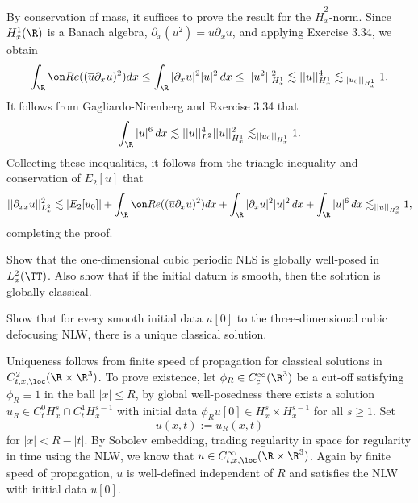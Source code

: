 \begin{solution}
	By conservation of mass, it suffices to prove the result for the $\dot H^2_x$-norm. Since $H^1_x (\R)$ is a Banach algebra, $\partial_x (u^2) = u \partial_x u$, and applying Exercise 3.34, we obtain
		\[ \int_\R \Re ((\overline u \partial_x u)^2) dx \leq \int_\R |\partial_x u|^2 |u|^2 \, dx \leq || u^2 ||_{H^1_x}^2 \lesssim ||u||_{H^1_x}^4 \lesssim_{||u_0||_{H^1_x}} 1.\]
	It follows from Gagliardo-Nirenberg and Exercise 3.34 that
		\[ \int_{\R} |u|^6 \, dx \lesssim ||u||_{L^2}^4 ||u||_{\dot H^1_x}^2 \lesssim_{||u_0||_{H^1_x}} 1. \]
	Collecting these inequalities, it follows from the triangle inequality and conservation of $E_2 [u]$ that	
		\[ ||\partial_{xx} u||_{L^2_x}^2 \lesssim |E_2[u_0]| + \int_\R \Re ((\overline u \partial_x u)^2) dx + \int_\R |\partial_x u|^2 |u|^2 \, dx  + \int_{\R} |u|^6 \, dx \lesssim_{||u||_{H^2_x}} 1,\]	
	completing the proof. 
\end{solution}

\begin{statement}
	Show that the one-dimensional cubic periodic NLS is globally well-posed in $L^2_x (\TT)$. Also show that if the initial datum is smooth, then the solution is globally classical. 
\end{statement}

\begin{solution}
	
\end{solution}

\begin{statement}
	Show that for every smooth initial data $u[0]$ to the three-dimensional cubic defocusing NLW, there is a unique classical solution. 
\end{statement}

\begin{solution}
	Uniqueness follows from finite speed of propagation for classical solutions in $C^2_{t, x, \loc} (\R \times \R^3)$. To prove existence, let $\phi_R \in C^\infty_c (\R^3)$ be a cut-off satisfying $\phi_R \equiv 1$ in the ball $|x| \leq R$, by global well-posedness there exists a solution $u_R \in C^0_t H^s_x \cap C^1_t H^{s - 1}_x$ with initial data $\phi_R u[0] \in H^s_x \times H^{s - 1}_x$ for all $s \geq 1$. Set
		\[ u(x, t) := u_R (x, t) \]
	for $|x| < R - |t|$. By Sobolev embedding, trading regularity in space for regularity in time using the NLW, we know that $u \in C^\infty_{t, x, \loc} (\R \times \R^3)$. Again by finite speed of propagation, $u$ is well-defined independent of $R$ and satisfies the NLW with initial data $u[0]$. 
\end{solution}

